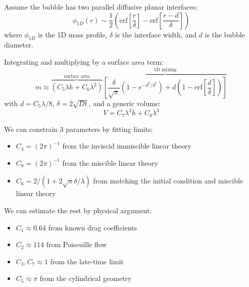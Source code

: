 \documentclass[12pt]{beamer}
\begin{document}
\begin{frame}
Assume the bubble has two parallel diffusive planar interfaces:
\begin{equation*}
\phi_{1D}(r) \sim \frac{1}{2} \left(\text{erf}\left[\frac{r}{\delta}\right] - \text{erf}\left[\frac{r - d}{\delta}\right] \right)
\end{equation*}
where $\phi_{1D}$ is the 1D mass profile, $\delta$ is the interface width, and $d$ is the bubble diameter.
\vspace{20pt}\pause

Integrating and multiplying by a surface area term:
\begin{equation*}
m \approx \overbrace{\left(C_5 \lambda h + C_6 \lambda^2\right)}^{\text{surface area}} \overbrace{\left[\frac{\delta}{\sqrt{\pi}} \left(1 - e^{-d^2 / \delta^2}\right) + d \left(1 - \text{erf}\left[\frac{d}{\delta}\right]\right)\right]}^{\text{1D mixing}}
\end{equation*}
with $d = C_5 \lambda / 8$, $\delta = 2 \sqrt{D t}$, and a generic volume:
\begin{equation*}
V = C_7 \lambda^2 h + C_8 \lambda^3
\end{equation*}
\end{frame}

\begin{frame}
We can constrain 3 parameters by fitting limits:
\begin{itemize}
  \item $C_4 = (2 \pi)^{-1}$ from the inviscid immiscible linear theory
  \item $C_8 = (2 \pi)^{-1}$ from the miscible linear theory
  \item $C_6 = 2/(1 + 2 \sqrt{\pi} \delta / \lambda)$ from matching the initial condition and miscible linear theory 
\end{itemize}\pause \vspace{10pt}

We can estimate the rest by physical argument:
\begin{itemize}
  \item $C_1 \approx 0.64$ from known drag coefficients
  \item $C_2 \approx 114$ from Poiseuille flow
  \item $C_3, C_7 \approx 1$ from the late-time limit
  \item $C_5 \approx \pi$ from the cylindrical geometry
\end{itemize}
\end{frame}
\end{document}
